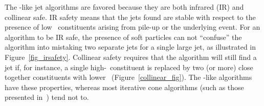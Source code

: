 The \kt-like jet algorithms are favored because they are both infrared (IR) and collinear safe. IR safety means that the jets found are stable with respect to the presence of low \pt~constituents arising from pile-up or the underlying event.  For an algorithm to be IR safe,  the presence of soft particles can not ``confuse'' the algorithm into mistaking two separate jets for a single large jet, as illustrated in Figure~\ref{fig_irsafety}. Collinear safety requires that the algorithm will still find a jet if, for instance, a single high-\pt~constituent is replaced by two (or more) close together constituents with lower \pt~(Figure~\ref{collinear_fig}). The \kt-like algorithms have these properties, whereas most iterative cone algorithms (such as those presented in~\cite{cones}) tend not to.




%


%
%
%
%

